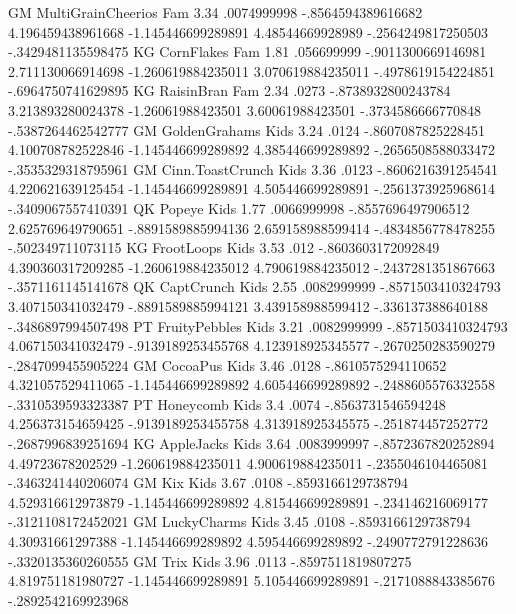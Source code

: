 GM	MultiGrainCheerios	Fam	3.34	.0074999998	-.8564594389616682	4.196459438961668	-1.145446699289891	4.48544669928989	-.2564249817250503	-.3429481135598475
KG	CornFlakes	Fam	1.81	.056699999	-.9011300669146981	2.711130066914698	-1.260619884235011	3.070619884235011	-.4978619154224851	-.6964750741629895
KG	RaisinBran	Fam	2.34	.0273	-.8738932800243784	3.213893280024378	-1.26061988423501	3.60061988423501	-.3734586666770848	-.5387264462542777
GM	GoldenGrahams	Kids	3.24	.0124	-.8607087825228451	4.100708782522846	-1.145446699289892	4.385446699289892	-.2656508588033472	-.3535329318795961
GM	Cinn.ToastCrunch	Kids	3.36	.0123	-.8606216391254541	4.220621639125454	-1.145446699289891	4.505446699289891	-.2561373925968614	-.3409067557410391
QK	Popeye	Kids	1.77	.0066999998	-.8557696497906512	2.625769649790651	-.8891589885994136	2.659158988599414	-.4834856778478255	-.502349711073115
KG	FrootLoops	Kids	3.53	.012	-.8603603172092849	4.390360317209285	-1.260619884235012	4.790619884235012	-.2437281351867663	-.3571161145141678
QK	CaptCrunch	Kids	2.55	.0082999999	-.8571503410324793	3.407150341032479	-.8891589885994121	3.439158988599412	-.336137388640188	-.3486897994507498
PT	FruityPebbles	Kids	3.21	.0082999999	-.8571503410324793	4.067150341032479	-.9139189253455768	4.123918925345577	-.2670250283590279	-.2847099455905224
GM	CocoaPus	Kids	3.46	.0128	-.8610575294110652	4.321057529411065	-1.145446699289892	4.605446699289892	-.2488605576332558	-.3310539593323387
PT	Honeycomb	Kids	3.4	.0074	-.8563731546594248	4.256373154659425	-.9139189253455758	4.313918925345575	-.251874457252772	-.2687996839251694
KG	AppleJacks	Kids	3.64	.0083999997	-.8572367820252894	4.49723678202529	-1.260619884235011	4.900619884235011	-.2355046104465081	-.3463241440206074
GM	Kix	Kids	3.67	.0108	-.8593166129738794	4.529316612973879	-1.145446699289892	4.815446699289891	-.234146216069177	-.3121108172452021
GM	LuckyCharms	Kids	3.45	.0108	-.8593166129738794	4.30931661297388	-1.145446699289892	4.595446699289892	-.2490772791228636	-.3320135360260555
GM	Trix	Kids	3.96	.0113	-.8597511819807275	4.819751181980727	-1.145446699289891	5.105446699289891	-.2171088843385676	-.2892542169923968
